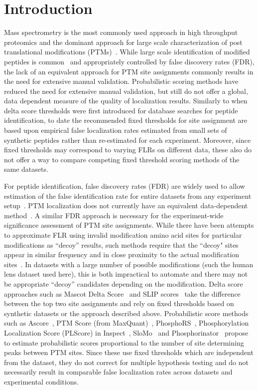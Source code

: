\documentclass[11pt]{article}
\begin{document}
\section{Introduction}
Mass spectrometry is the most commonly used approach in high throughput proteomics and the dominant approach for large scale characterization of post translational modifications (PTMs)~\cite{mann03}.  While large scale identification of modified peptides is common~\cite{beausoleil04,dephoure08,Trinidad2012} and appropriately controlled by false discovery rates (FDR), the lack of an equivalent approach for PTM site assignments commonly results in the need for extensive manual validation. Probabilistic scoring methods have reduced the need for extensive manual validation, but still do not offer a global, data dependent measure of the quality of localization results. Similarly to when delta score thresholds were first introduced for database searches for peptide identification, to date the recommended fixed thresholds for site assignment are based upon empirical false localization rates estimated from small sets of synthetic peptides rather than re-estimated for each experiment. Moreover, since fixed thresholds may correspond to varying FLRs on different data, these also do not offer a way to compare competing fixed threshold scoring methods of the same datasets.

For peptide identification, false discovery rates (FDR) are widely used to allow estimation of the false identification rate for entire datasets from any experiment setup~\cite{nesvizhskii10}. PTM localization does not currently have an equivalent data-dependent method~\cite{chalkley12}. A similar FDR approach is necessary for the experiment-wide significance assessment of PTM site assignments. While there have been attempts to approximate FLR using invalid modification amino acid sites for particular modifications as ``decoy'' results, such methods require that the ``decoy" sites appear in similar frequency and in close proximity to the actual modification sites~\cite{Baker2011}. In datasets with a large number of possible modifications (such the human lens dataset used here), this is both impractical to automate and there may not be appropriate ``decoy'' candidates depending on the modification. Delta score approaches such as Mascot Delta Score~\cite{savitski11} and SLIP scores~\cite{Baker2011} take the difference between the top two site assignments and rely on fixed thresholds based on synthetic datasets or the approach described above. Probabilistic score methods such as Ascore~\cite{beausoleil06}, PTM Score (from MaxQuant)~\cite{Olsen2004}, PhosphoRS~\cite{Taus2011}, Phosphorylation Localization Score
(PLScore) in Inspect~\cite{Albuquerque2008}, SloMo~\cite{Bailey2009} and Phosphorinator~\cite{Phanstiel2011} propose to estimate probabilistic scores proportional to the number of site determining peaks between PTM sites. Since these use fixed thresholds which are independent from the dataset, they do not correct for multiple hypothesis testing and do not necessarily result in comparable false localization rates across datasets and experimental conditions.
\end{document}
